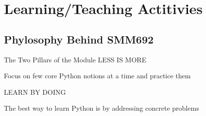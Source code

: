 \documentclass[aspectratio=1610]{beamer}
\begin{document}
\section{Learning/Teaching Actitivies}

\subsection{Phylosophy Behind SMM692}

\begin{frame}{The Two Pillars of the Module}
\centering
	\LARGE LESS IS MORE

	\Large Focus on few core Python notions at a time and practice them

\vspace{1.5em}

	\LARGE LEARN BY DOING

	\Large The best way to learn Python is by addressing concrete problems

\end{frame}
\end{document}
